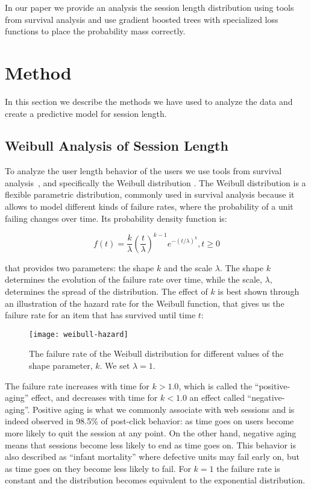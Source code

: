 In our paper we provide an analysis the session length distribution using
tools from survival analysis and use gradient boosted trees with specialized
loss functions to place the probability mass correctly.

\section{Method}
\label{sec:session-length-method}

In this section we describe the methods we have used to analyze the data
and create a predictive model for session length.

\subsection{Weibull Analysis of Session Length}

To analyze the user length behavior of the users we use tools from survival analysis~\cite{survival-analysis}, and specifically the Weibull distribution
\cite{weibull-survival}. The Weibull distribution is a flexible parametric distribution,
commonly used in survival analysis because it allows to model different kinds of failure
rates, where the probability of a unit failing changes over time. Its probability
density function is:

\begin{equation}
\label{eq:weibull-pdf}
f(t) = \frac{k}{\lambda}\left( \frac{t}{\lambda}\right)^{k-1}e^{-(t/\lambda)^k}, t \geq 0
\end{equation}



that provides two parameters: the shape $k$ and the scale $\lambda$. The shape $k$ determines
the evolution of the failure rate over time, while the scale, $\lambda$, determines the spread
of the distribution. The effect of $k$ is best shown through an illustration of the hazard rate
for the Weibull function, that gives us the failure rate for an item that has survived until time
$t$:

\begin{figure}
	\centering
	\texttt{[image: weibull-hazard]}
	\caption{The failure rate of the Weibull distribution for different values of the shape parameter, $k$. We set $\lambda = 1$.}
	\label{fig:weibull-failure-rate}
\end{figure}

The failure rate increases with time for $k > 1.0$, which is called the ``positive-aging''
effect, and decreases with time for $k < 1.0$ an effect called ``negative-aging''. Positive aging
is what we commonly associate with web sessions and is indeed observed in 98.5\% of post-click
behavior\cite{weibull-web-browsing}: as time goes on users become more likely to quit the session
at any point. On the other hand, negative aging means that sessions become less likely to end
as time goes on. This behavior is also described as ``infant mortality'' where defective units
may fail early on, but as time goes on they become less likely to fail.
For $k = 1$ the failure rate is constant and the distribution becomes equivalent to the
exponential distribution.

